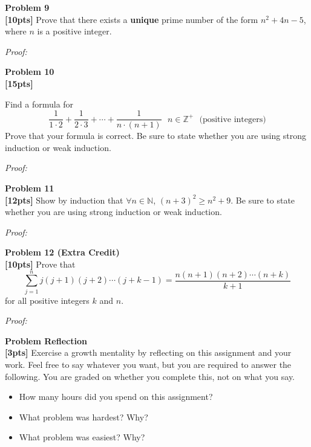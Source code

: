 \documentclass{article}
\newenvironment{problem}[2][Problem]
    { \begin{mdframed}[backgroundcolor=gray!20] \textbf{#1 #2} \\}
    {  \end{mdframed}}
\newenvironment{solution}
    {\textit{Proof:}}
    {}
\begin{document}
\begin{problem}{9}
\textbf{[10pts]} Prove that there exists a \textbf{unique} prime number of the form $n^2 + 4n - 5$, where $n$ is a positive integer.
\end{problem}

\begin{solution}
\end{solution}


\begin{problem}{10}
\textbf{[15pts]} \item Find a formula for
$$ \frac{1}{1\cdot 2} + \frac{1}{2\cdot 3} + \cdots + \frac{1}{n\cdot (n+1)}\ \ \ n\in\mathbb{Z}^+\ \ \ \text{(positive integers)}$$
Prove that your formula is correct. Be sure to state whether you are using strong induction or weak induction.
\end{problem}

\begin{solution}
\end{solution}

\begin{problem}{11}
\textbf{[12pts]} Show by induction that $\forall n\in\mathbb{N}$, $(n+3)^2\geq n^2+9$. Be sure to state whether you are using strong induction or weak induction.
\end{problem}

\begin{solution}
\end{solution}

\newpage
\begin{problem}{12 (Extra Credit)}
\textbf{[10pts]} Prove that $$\sum_{j=1}^n j(j+1)(j+2)\cdots(j+k-1)=\frac{n(n+1)(n+2)\cdots(n+k)}{k+1}$$ for all positive integers $k$ and $n$.
\end{problem}

\begin{solution}
\end{solution}

\begin{problem}{Reflection}
\textbf{[3pts]} Exercise a growth mentality by reflecting on this assignment and your work. Feel free to say whatever you want, but you are required to answer the following. You are graded on whether you complete this, not on what you say.
\begin{itemize}
\item How many hours did you spend on this assignment?
\item What problem was hardest? Why?
\item What problem was easiest? Why?
\end{itemize}
\end{problem}
\end{document}
